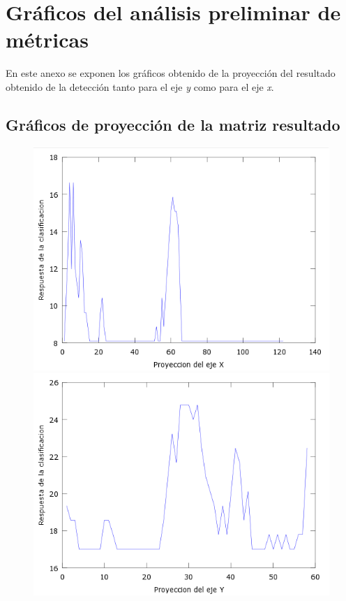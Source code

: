 \chapter{Gráficos del análisis preliminar de métricas}
\label{cap:gapm}


En este anexo se exponen los gráficos obtenido de la proyección del resultado obtenido de la detección tanto para el eje \textit{y} como para el eje \textit{x}.

\section{Gráficos de proyección de la matriz resultado}

\begin{figure}[htc]
  \centering
  \includegraphics[scale=.4]{images/plots/boost1X}
  \includegraphics[scale=.4]{images/plots/boost1Y}

\end{figure}
